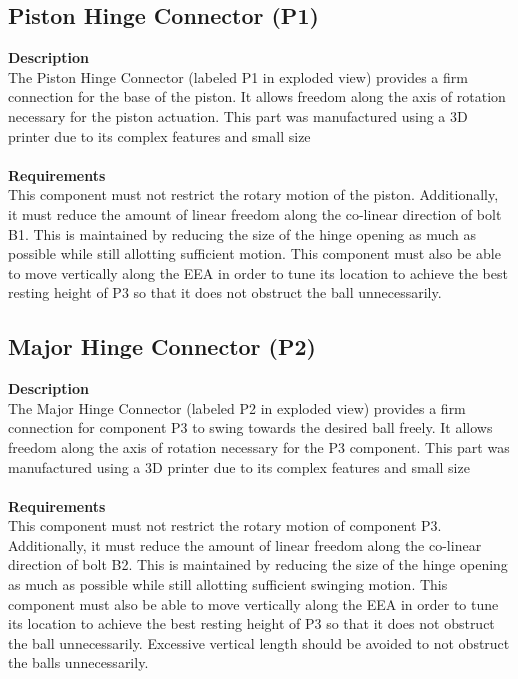 \documentclass[titlepage]{article}
\begin{document}
\subsection{Piston Hinge Connector (P1)}
\textbf{Description}\\
The Piston Hinge Connector (labeled P1 in exploded view) provides a firm connection for the base of the piston. It allows freedom along the axis of rotation necessary for the piston actuation. This part was manufactured using a 3D printer due to its complex features and small size\\~\\
\textbf{Requirements}\\
This component must not restrict the rotary motion of the piston. Additionally, it must reduce the amount of linear freedom along the co-linear direction of bolt B1. This is maintained by reducing the size of the hinge opening as much as possible while still allotting sufficient motion. This component must also be able to move vertically along the EEA in order to tune its location to achieve the best resting height of P3 so that it does not obstruct the ball unnecessarily.

\subsection{Major Hinge Connector (P2)}
\textbf{Description}\\
The Major Hinge Connector (labeled P2 in exploded view) provides a firm connection for component P3 to swing towards the desired ball freely. It allows freedom along the axis of rotation necessary for the P3 component. This part was manufactured using a 3D printer due to its complex features and small size\\~\\
\textbf{Requirements}\\
This component must not restrict the rotary motion of component P3. Additionally, it must reduce the amount of linear freedom along the co-linear direction of bolt B2. This is maintained by reducing the size of the hinge opening as much as possible while still allotting sufficient swinging motion. This component must also be able to move vertically along the EEA in order to tune its location to achieve the best resting height of P3 so that it does not obstruct the ball unnecessarily. Excessive vertical length should be avoided to not obstruct the balls unnecessarily.
\end{document}
